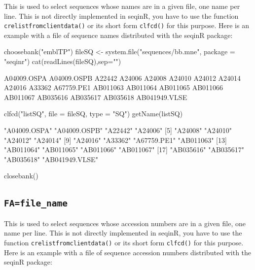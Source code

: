 \documentclass{article}
\begin{document}
This is used to select sequences whose names are in a given file, one name per line.
This is not directly implemented in seqinR, you have to use the function
\texttt{crelistfromclientdata()} or its short form \texttt{clfcd()} for this purpose. Here is an example with
a file of sequence names distributed with the seqinR package:

\begin{Schunk}
\begin{Sinput}
 choosebank("emblTP")
 fileSQ <- system.file("sequences/bb.mne", package = "seqinr")
 cat(readLines(fileSQ),sep="\n")
\end{Sinput}
\begin{Soutput}
A04009.OSPA
A04009.OSPB
A22442
A24006
A24008
A24010
A24012
A24014
A24016
A33362
A67759.PE1
AB011063
AB011064
AB011065
AB011066
AB011067
AB035616
AB035617
AB035618
AB041949.VLSE
\end{Soutput}
\begin{Sinput}
 clfcd("listSQ", file = fileSQ, type = "SQ")
 getName(listSQ)
\end{Sinput}
\begin{Soutput}
 [1] "A04009.OSPA"   "A04009.OSPB"   "A22442"        "A24006"       
 [5] "A24008"        "A24010"        "A24012"        "A24014"       
 [9] "A24016"        "A33362"        "A67759.PE1"    "AB011063"     
[13] "AB011064"      "AB011065"      "AB011066"      "AB011067"     
[17] "AB035616"      "AB035617"      "AB035618"      "AB041949.VLSE"
\end{Soutput}
\begin{Sinput}
 closebank()
\end{Sinput}
\end{Schunk}


\subsection{\texttt{FA=file\_name}}

This is used to select sequences whose accession numbers are in a given file, one name per line.
This is not directly implemented in seqinR, you have to use the function
\texttt{crelistfromclientdata()} or its short form \texttt{clfcd()} for this purpose. Here is an example with
a file of sequence accession numbers distributed with the seqinR package:
\end{document}
